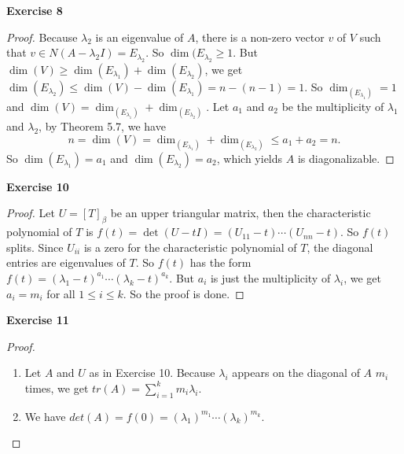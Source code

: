 \documentclass[12pt, a4paper]{article}
\theoremstyle{plain}
\newenvironment{exercise}[2][Exercise]
    { \begin{mdframed}[backgroundcolor=gray!20] \textbf{#1 #2} \\}
    {  \end{mdframed}}
\begin{document}
\begin{exercise}{8}

\end{exercise}
	\begin{proof}
	Because $\lambda_2$ is an eigenvalue of $A$, there is a non-zero vector $v$ of $V$ such that $v\in N(A-\lambda_2 I) = E_{\lambda_2}$. So $\dim(E_{\lambda_2}\geq 1$. But $\dim(V)\geq \dim(E_{\lambda_1})+\dim(E_{\lambda_2})$, we get $\dim(E_{\lambda_2})\leq \dim(V)-\dim(E_{\lambda_1})=n-(n-1)=1$. So $\dim_(E_{\lambda_1})=1$ and $\dim(V)=\dim_(E_{\lambda_1})+\dim_(E_{\lambda_2})$. Let $a_1$ and $a_2$ be the multiplicity of $\lambda_1$ and $\lambda_2$, by Theorem 5.7, we have 
	\[
	n=\dim(V)=\dim_(E_{\lambda_1})+\dim_(E_{\lambda_2})\leq a_1+a_2=n.
	\]
	So $\dim(E_{\lambda_1})=a_1$ and $\dim(E_{\lambda_2})=a_2$, which yields $A$ is diagonalizable.
	\end{proof}
	
\begin{exercise}{10}

\end{exercise}
	\begin{proof}
	Let $U=[T]_\beta$ be an upper triangular matrix, then the characteristic polynomial of $T$ is $f(t)=\det(U-tI)=(U_{11}-t)\cdots(U_{nn}-t)$. So $f(t)$ splits. Since $U_{ii}$ is a zero for the characteristic polynomial of $T$, the diagonal entries are eigenvalues of $T$. So $f(t)$ has the form $f(t)=(\lambda_1-t)^{a_1}\cdots (\lambda_k-t)^{a_k}$. But $a_i$ is just the multiplicity of $\lambda_i$, we get $a_i=m_i$ for all $1\leq i\leq k$. So the proof is done.
	\end{proof}
	
\begin{exercise}{11}

\end{exercise}
	\begin{proof}
	\hfill
	\begin{enumerate}[label=(\alph*)]
	\item Let $A$ and $U$ as in Exercise 10. Because $\lambda_i$ appears on the diagonal of $A$ $m_i$ times, we get $tr(A)=\sum_{i=1}^{k}{m_i\lambda_i}$.
	\item We have $det(A)=f(0)=(\lambda_1)^{m_1}\cdots(\lambda_k)^{m_k}$.
	\end{enumerate}
	\end{proof}
	
\end{document}
